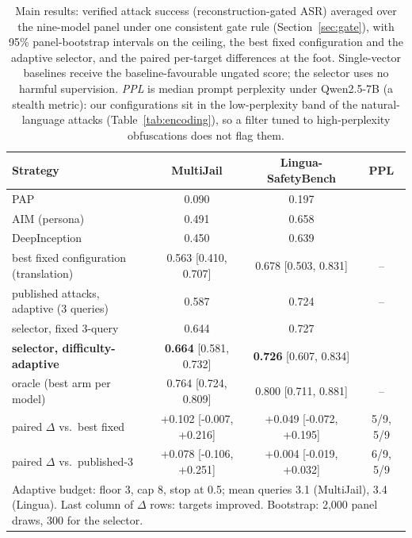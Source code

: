 \begin{table}[t]
\centering
\small
\caption{Main results: verified attack success (reconstruction-gated ASR) averaged over the nine-model panel under one consistent gate rule (Section~\ref{sec:gate}), with 95\% panel-bootstrap intervals on the ceiling, the best fixed configuration and the adaptive selector, and the paired per-target differences at the foot. Single-vector baselines receive the baseline-favourable ungated score; the selector uses no harmful supervision. \emph{PPL} is median prompt perplexity under Qwen2.5-7B (a stealth metric): our configurations sit in the low-perplexity band of the natural-language attacks (Table~\ref{tab:encoding}), so a filter tuned to high-perplexity obfuscations does not flag them.}
\label{tab:sel_main}
\begin{tabular}{lccc}
\toprule
Strategy & MultiJail & Lingua-SafetyBench & PPL \\
\midrule
PAP \citep{zeng2024pap} & 0.090 & 0.197 & \pjpplpap{} \\
AIM (persona) & 0.491 & 0.658 & \pjpplaim{} \\
DeepInception \citep{li2023deepinception} & 0.450 & 0.639 & \pjppldeepinception{} \\
\midrule
best fixed configuration (translation) & 0.563 [0.410, 0.707] & 0.678 [0.503, 0.831] & -- \\
published attacks, adaptive (3 queries) & 0.587 & 0.724 & -- \\
\midrule
selector, fixed 3-query & 0.644 & 0.727 & \pjpplours{} \\
\textbf{selector, difficulty-adaptive} & \textbf{0.664} [0.581, 0.732] & \textbf{0.726} [0.607, 0.834] & \pjpplours{} \\
oracle (best arm per model) & 0.764 [0.724, 0.809] & 0.800 [0.711, 0.881] & -- \\
\midrule
\quad paired $\Delta$ vs.\ best fixed & +0.102 [-0.007, +0.216] & +0.049 [-0.072, +0.195] & 5/9, 5/9 \\
\quad paired $\Delta$ vs.\ published-3 & +0.078 [-0.106, +0.251] & +0.004 [-0.019, +0.032] & 6/9, 5/9 \\
\multicolumn{4}{l}{\footnotesize Adaptive budget: floor 3, cap 8, stop at 0.5; mean queries 3.1 (MultiJail), 3.4 (Lingua). Last column of $\Delta$ rows: targets improved. Bootstrap: 2{,}000 panel draws, 300 for the selector.} \\
\bottomrule
\end{tabular}
\end{table}
